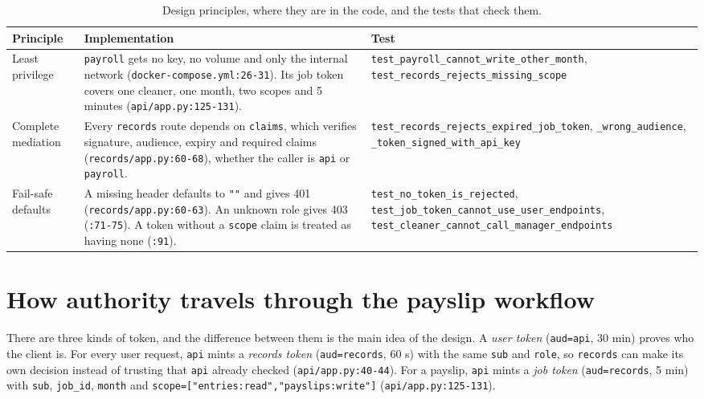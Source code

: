 \documentclass[11pt,a4paper]{article}
\newcommand{\file}[1]{\nolinkurl{#1}}
\newcommand{\test}[1]{\nolinkurl{#1}}
\begin{document}
\begin{table}[h]
\centering\small
\begin{tabularx}{\textwidth}{@{}lYY@{}}
\toprule
Principle & Implementation & Test \\
\midrule
Least privilege & \texttt{payroll} gets no key, no volume and only the internal network (\file{docker-compose.yml:26-31}). Its job token covers one cleaner, one month, two scopes and 5 minutes (\file{api/app.py:125-131}). & \test{test_payroll_cannot_write_other_month}, \test{test_records_rejects_missing_scope} \\
Complete mediation & Every \texttt{records} route depends on \texttt{claims}, which verifies signature, audience, expiry and required claims (\file{records/app.py:60-68}), whether the caller is \texttt{api} or \texttt{payroll}. & \test{test_records_rejects_expired_job_token}, \test{_wrong_audience}, \test{_token_signed_with_api_key} \\
Fail-safe defaults & A missing header defaults to \texttt{""} and gives 401 (\file{records/app.py:60-63}). An unknown role gives 403 (\file{:71-75}). A token without a \texttt{scope} claim is treated as having none (\file{:91}). & \test{test_no_token_is_rejected}, \test{test_job_token_cannot_use_user_endpoints}, \test{test_cleaner_cannot_call_manager_endpoints} \\
\bottomrule
\end{tabularx}
\caption{Design principles, where they are in the code, and the tests that check them.}
\end{table}

\section{How authority travels through the payslip workflow}

There are three kinds of token, and the difference between them is the main idea of the design. A \emph{user token} (\texttt{aud=api}, 30 min) proves who the client is. For every user request, \texttt{api} mints a \emph{records token} (\texttt{aud=records}, 60 s) with the same \texttt{sub} and \texttt{role}, so \texttt{records} can make its own decision instead of trusting that \texttt{api} already checked (\file{api/app.py:40-44}). For a payslip, \texttt{api} mints a \emph{job token} (\texttt{aud=records}, 5 min) with \texttt{sub}, \texttt{job\_id}, \texttt{month} and \texttt{scope=["entries:read","payslips:write"]} (\file{api/app.py:125-131}).
\end{document}
